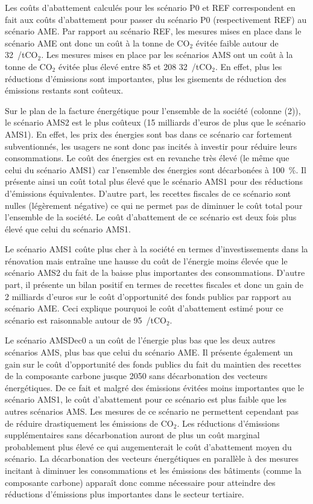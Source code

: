 \documentclass[10.5pt,a4paper]{article}
\def\euro{\mbox{\raisebox{.25ex}{{\it =}}\hspace{-.5em}{\sf C}}}
\begin{document}
{Les coûts d'abattement calculés pour les scénario P0 et REF correspondent en fait aux coûts d'abattement pour passer du scénario P0 (respectivement REF) au scénario AME. Par rapport au scénario REF, les mesures mises en place dans le scénario AME ont donc un coût à la tonne de CO$_2$ évitée faible autour de 32~\euro/tCO$_2$. Les mesures mises en place par les scénarios AMS ont un coût  à la tonne de CO$_2$ évitée plus élevé entre 85 et 208 32~\euro/tCO$_2$. En effet, plus les réductions d'émissions sont importantes, plus les gisements de réduction des émissions restants sont coûteux. 

Sur le plan de la facture énergétique pour l'ensemble de la société (colonne (2)), le scénario AMS2 est le plus coûteux (15 milliards d'euros de plus que le scénario AMS1). En effet, les prix des énergies sont bas dans ce scénario car fortement subventionnés, les usagers ne sont donc pas incités à investir pour réduire leurs consommations. Le coût des énergies est en revanche très élevé (le même que celui du scénario AMS1) car l'ensemble des énergies sont décarbonées à 100~\%. Il présente ainsi un coût total plus élevé que le scénario AMS1 pour des réductions d'émissions équivalentes. D'autre part, les recettes fiscales de ce scénario sont nulles (légèrement négative) ce qui ne permet pas de diminuer le coût total pour l'ensemble de la société. Le coût d'abattement de ce scénario est deux fois plus élevé que celui du scénario AMS1. 

Le scénario AMS1 coûte plus cher à la société en termes d'investissements dans la rénovation mais entraîne une hausse du coût de l'énergie moins élevée que le scénario AMS2 du fait de la baisse plus importantes des consommations. D'autre part, il présente un bilan positif en termes de recettes fiscales et donc un gain de 2 milliards d'euros sur le coût d'opportunité des fonds publics par rapport au scénario AME. Ceci explique pourquoi le coût d'abattement estimé pour ce scénario est raisonnable autour de 95~\euro/tCO$_2$. 

Le scénario AMSDec0 a un coût de l'énergie plus bas que les deux autres scénarios AMS, plus bas que celui du scénario AME. Il présente également un gain sur le coût d'opportunité des fonds publics du fait du maintien des recettes de la composante carbone jusque 2050 sans décarbonation des vecteurs énergétiques. De ce fait et malgré des émissions évitées moins importantes que le scénario AMS1, le coût d'abattement pour ce scénario est plus faible que les autres scénarios AMS. Les mesures de ce scénario ne permettent cependant pas de réduire drastiquement les émissions de CO$_2$. Les réductions d'émissions supplémentaires sans décarbonation auront de plus un coût marginal probablement plus élevé ce qui augementerait le coût d'abattement moyen du scénario. La décarbonation des vecteurs énergétiques en parallèle à des mesures incitant à diminuer les consommations et les émissions des bâtiments (comme la composante carbone) apparaît donc comme nécessaire pour atteindre des réductions d'émissions plus importantes dans le secteur tertiaire. 

}
\end{document}
